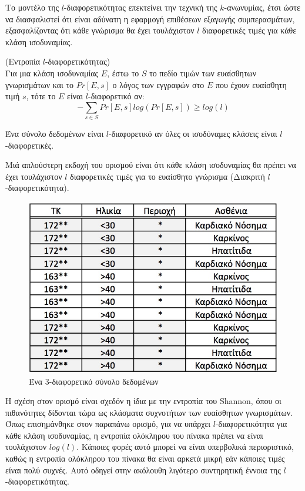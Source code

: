Το μοντέλο της $l$-διαφορετικότητας επεκτείνει την τεχνική της $k$-ανωνυμίας, έτσι ώστε να διασφαλιστεί ότι είναι αδύνατη η εφαρμογή επιθέσεων εξαγωγής συμπερασμάτων, εξασφαλίζοντας ότι κάθε γνώρισμα θα έχει τουλάχιστον $l$ διαφορετικές τιμές για κάθε κλάση ισοδυναμίας. 

\begin{definition}(Εντροπία $l$-διαφορετικότητας)\\
Για μια κλάση ισοδυναμίας $E$, έστω το $S$ το πεδίο τιμών των ευαίσθητων γνωρισμάτων και το $Pr [E, s]$ ο λόγος των εγγραφών στο $E$ που έχουν ευαίσθητη τιμή $s$, τότε το $E$ είναι $l$-διαφορετικό αν:
$$-\sum_{s\in S}Pr[E,s]log(Pr[E,s])\geq log(l)$$

\end{definition}

\begin{definition}
Ένα σύνολο δεδομένων είναι $l$-διαφορετικό αν όλες οι ισοδύναμες κλάσεις είναι $l$-διαφορετικές.
\end{definition}

Μιά απλούστερη εκδοχή του ορισμού είναι ότι κάθε κλάση ισοδυναμίας θα πρέπει να έχει τουλάχιστον $l$ διαφορετικές τιμές για το ευαίσθητο γνώρισμα (Διακριτή $l$-διαφορετικότητα).



\begin{figure} [h!]
\begin{center}
  \includegraphics[scale=0.36]{images/k_anon.jpg}
  \caption{Ένα 3-διαφορετικό σύνολο δεδομένων}
  \end{center}
\end{figure}

 Η σχέση στον ορισμό είναι σχεδόν η ίδια με την εντροπία του \textlatin{Shannon}, όπου οι πιθανότητες δίδονται τώρα ως κλάσματα συχνοτήτων των ευαίσθητων γνωρισμάτων. Όπως επισημάνθηκε στον παραπάνω ορισμό, για να υπάρχει $l$-διαφορετικότητα για κάθε κλάση ισοδυναμίας, η εντροπία ολόκληρου του πίνακα πρέπει να είναι τουλάχιστον $log (l)$. Κάποιες φορές αυτό μπορεί να είναι υπερβολικά περιοριστικό, καθώς η εντροπία ολόκληρου του πίνακα θα είναι αρκετά μικρή εάν κάποιες τιμές είναι πολύ συχνές. Αυτό οδηγεί στην ακόλουθη λιγότερο συντηρητική έννοια της $l$-διαφορετικότητας.
 
